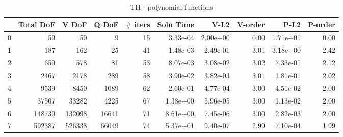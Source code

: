 \documentclass[12pt]{extarticle}
\numberwithin{equation}{section}    %
\begin{document}
\pagestyle{fancyplain}
\fancyhead{}
\fancyfoot{} %
\fancyfoot[LE,RO]{\thepage \hspace{-5mm}}
\fancyfoot[CO,RE]{}
\begin{landscape}


\begin{table}

\begin{tabular}[h!]{lrrrrrrrrr}

\hline

{} &  Total DoF &   V DoF &  Q DoF &  $\#$ iters &  Soln Time &      V-L2 &  V-order &      P-L2 &  P-order \\
\hline
0 &         59 &      50 &      9 &       15 &   3.33e-04 &  2.00e+00 &     0.00 &  1.71e+01 &     0.00 \\
1 &        187 &     162 &     25 &       41 &   1.48e-03 &  2.49e-01 &     3.01 &  3.18e+00 &     2.42 \\
2 &        659 &     578 &     81 &       53 &   8.07e-03 &  3.08e-02 &     3.02 &  7.33e-01 &     2.12 \\
3 &       2467 &    2178 &    289 &       58 &   3.90e-02 &  3.82e-03 &     3.01 &  1.81e-01 &     2.02 \\
4 &       9539 &    8450 &   1089 &       62 &   2.60e-01 &  4.77e-04 &     3.00 &  4.51e-02 &     2.00 \\
5 &      37507 &   33282 &   4225 &       67 &   1.38e+00 &  5.96e-05 &     3.00 &  1.13e-02 &     2.00 \\
6 &     148739 &  132098 &  16641 &       71 &   8.61e+00 &  7.45e-06 &     3.00 &  2.82e-03 &     2.00 \\
7 &     592387 &  526338 &  66049 &       74 &   5.37e+01 &  9.40e-07 &     2.99 &  7.10e-04 &     1.99 \\
\hline
\end{tabular}
\caption{TH - polynomial functions}
\end{table}



\end{landscape}
\end{document}
